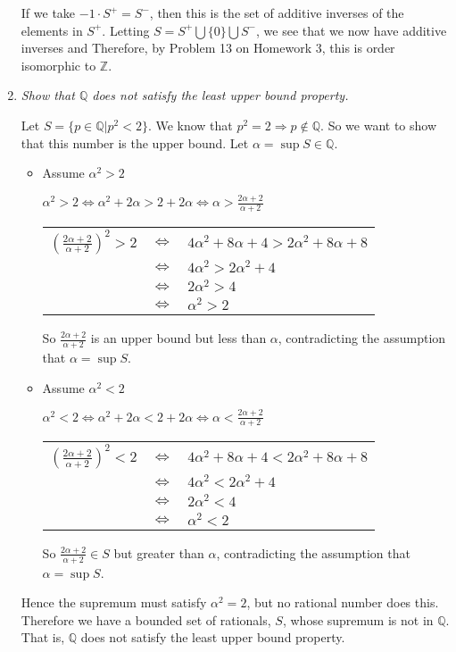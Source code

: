 \documentclass[11pt]{article}
\begin{document}
\begin{enumerate}
If we take $-1 \cdot S^+ = S^-$, then this is the set of additive inverses of the elements in $S^+$.  Letting $S= S^+ \bigcup \{0\} \bigcup S^-$, we see that we now have additive inverses and  Therefore, by Problem 13 on Homework 3, this is order isomorphic to $\mathbb{Z}$.

\item \emph{Show that $\mathbb{Q}$ does not satisfy the least upper bound property.}

Let $S = \{p \in \mathbb{Q} | p^2 < 2\}$.  We know that $p^2 = 2 \Rightarrow p \notin \mathbb{Q}$.  So we want to show that this number is the upper bound.  Let $\alpha = \sup{S} \in \mathbb{Q}$.

\begin{itemize}
\item Assume $\alpha^2 > 2$

$\alpha^2 > 2 \Leftrightarrow \alpha^2 + 2\alpha > 2 + 2\alpha \Leftrightarrow \alpha > \frac{2\alpha + 2}{\alpha+2}$

\begin{tabular}{lll}
$(\frac{2\alpha + 2}{\alpha+2})^2 > 2$ 	& $\Leftrightarrow$ 	& $4\alpha^2 + 8\alpha + 4 > 2\alpha^2 + 8\alpha + 8$ \\
					& $\Leftrightarrow$	& $4\alpha^2 > 2\alpha^2 + 4$ \\
					& $\Leftrightarrow$	& $2\alpha^2 > 4$ \\
					& $\Leftrightarrow$	& $\alpha^2 > 2$
\end{tabular}

So $\frac{2\alpha + 2}{\alpha+2}$ is an upper bound but less than $\alpha$, contradicting the assumption that $\alpha = \sup{S}$.

\item Assume $\alpha^2 < 2$

$\alpha^2 < 2 \Leftrightarrow \alpha^2 + 2\alpha < 2 + 2\alpha \Leftrightarrow \alpha < \frac{2\alpha + 2}{\alpha+2}$

\begin{tabular}{lll}
$(\frac{2\alpha + 2}{\alpha+2})^2 < 2$ 	& $\Leftrightarrow$ 	& $4\alpha^2 + 8\alpha + 4 < 2\alpha^2 + 8\alpha + 8$ \\
					& $\Leftrightarrow$	& $4\alpha^2 < 2\alpha^2 + 4$ \\
					& $\Leftrightarrow$	& $2\alpha^2 < 4$ \\
					& $\Leftrightarrow$	& $\alpha^2 < 2$
\end{tabular}

So $\frac{2\alpha + 2}{\alpha+2} \in S$ but greater than $\alpha$, contradicting the assumption that $\alpha = \sup{S}$.
\end{itemize}
Hence the supremum must satisfy $\alpha^2 = 2$, but no rational number does this.  Therefore we have a bounded set of rationals, $S$, whose supremum is not in $\mathbb{Q}$.  That is, $\mathbb{Q}$ does not satisfy the least upper bound property.


\end{enumerate}
\end{document}
